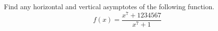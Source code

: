 Find any horizontal and vertical asymptotes of the following function.
\begin{equation*}
  f(x) = \frac{x^7+1234567}{x^7+1}
\end{equation*}
